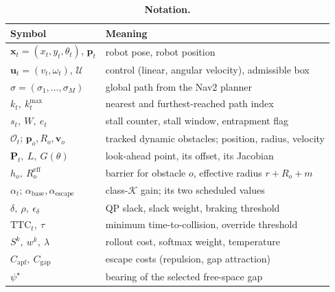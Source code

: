\begin{table}[!htbp]
\centering
\caption{\textbf{Notation.}}
\label{tab:notation}
\small
\begin{tabular}{ll}
\toprule
Symbol & Meaning \\
\midrule
$\mathbf{x}_t=(x_t,y_t,\theta_t)$, $\mathbf{p}_t$ & robot pose, robot position \\
$\mathbf{u}_t=(v_t,\omega_t)$, $\mathcal{U}$ & control (linear, angular velocity), admissible box \\
$\sigma=(\sigma_1,\dots,\sigma_M)$ & global path from the Nav2 planner \\
$k_t,\ k^{\max}_t$ & nearest and furthest-reached path index \\
$s_t,\ W,\ e_t$ & stall counter, stall window, entrapment flag \\
$\mathcal{O}_t$; $\mathbf{p}_o, R_o, \mathbf{v}_o$ & tracked dynamic obstacles; position, radius, velocity \\
$\mathbf{P}_t,\ L,\ G(\theta)$ & look-ahead point, its offset, its Jacobian \\
$h_o,\ R^{\mathrm{eff}}_o$ & barrier for obstacle $o$, effective radius $r+R_o+m$ \\
$\alpha_t$; $\alpha_{\mathrm{base}},\alpha_{\mathrm{escape}}$ & class-$\mathcal{K}$ gain; its two scheduled values \\
$\delta,\ \rho,\ \epsilon_\delta$ & QP slack, slack weight, braking threshold \\
$\mathrm{TTC}_t,\ \tau$ & minimum time-to-collision, override threshold \\
$S^k,\ w^k,\ \lambda$ & rollout cost, softmax weight, temperature \\
$C_{\mathrm{apf}},\ C_{\mathrm{gap}}$ & escape costs (repulsion, gap attraction) \\
$\psi^\star$ & bearing of the selected free-space gap \\
\bottomrule
\end{tabular}
\end{table}
